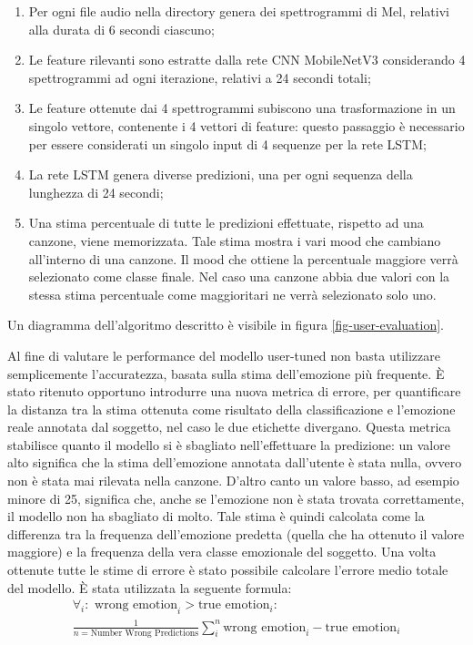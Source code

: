 \documentclass[11pt]{report}
\begin{document}
\begin{enumerate}
    \item Per ogni file audio nella directory genera dei spettrogrammi di Mel, relativi alla durata di 6 secondi ciascuno;
    
    \item Le feature rilevanti sono estratte dalla rete CNN MobileNetV3 considerando 4 spettrogrammi ad ogni iterazione, relativi a 24 secondi totali;
    
    \item Le feature ottenute dai 4 spettrogrammi subiscono una trasformazione in un singolo vettore, contenente i 4 vettori di feature: questo passaggio è necessario per essere considerati un singolo input di 4 sequenze per la rete LSTM;
    
    \item  La rete LSTM genera diverse predizioni, una per ogni sequenza della lunghezza di 24 secondi;
    
    \item Una stima percentuale di tutte le predizioni effettuate, rispetto ad una canzone, viene memorizzata. Tale stima mostra i vari mood che cambiano all'interno di una canzone. Il mood che ottiene la percentuale maggiore verrà selezionato come classe finale. Nel caso una canzone abbia due valori con la stessa stima percentuale come maggioritari ne verrà selezionato solo uno.
    
    
\end{enumerate}

Un diagramma dell'algoritmo descritto è visibile in figura \ref{fig-user-evaluation}.


\newpage

Al fine di valutare le performance del modello user-tuned non basta utilizzare semplicemente l'accuratezza, basata sulla stima dell'emozione più frequente. È stato ritenuto opportuno introdurre una nuova metrica di errore, per quantificare la distanza tra la stima ottenuta come risultato della classificazione e l'emozione reale annotata dal soggetto, nel caso le due etichette divergano. Questa metrica stabilisce quanto il modello si è sbagliato nell'effettuare la predizione: un valore alto significa che la stima dell'emozione annotata dall'utente è stata nulla, ovvero non è stata mai rilevata nella canzone. D'altro canto un valore basso, ad esempio minore di 25, significa che, anche se l'emozione non è stata trovata correttamente, il modello non ha sbagliato di molto. Tale stima è quindi calcolata come la differenza tra la frequenza dell'emozione predetta (quella che ha ottenuto il valore maggiore) e la frequenza della vera classe emozionale del soggetto. Una volta ottenute tutte le stime di errore è stato possibile calcolare l'errore medio totale del modello. È stata utilizzata la seguente formula:
\begin{equation}
\begin{multlined}
\forall_i: \text{ wrong emotion}_i > \text{true emotion}_i: \\
\frac{1}{n  = \text{Number Wrong Predictions}} \sum_{i}^n \text{wrong emotion}_i - \text{true emotion}_i
\end{multlined}
\end{equation}
\end{document}
